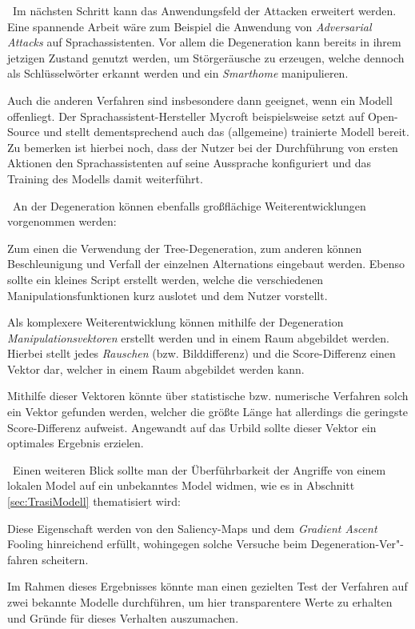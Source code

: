 ~\newline Im nächsten Schritt kann das Anwendungsfeld der Attacken erweitert werden. Eine spannende Arbeit wäre zum Beispiel die Anwendung von \textit{Adversarial Attacks} auf Sprachassistenten. 
Vor allem die Degeneration kann bereits in ihrem jetzigen Zustand genutzt werden, um Störgeräusche zu erzeugen, welche dennoch als Schlüsselwörter erkannt werden und ein \textit{Smarthome} manipulieren. 

Auch die anderen Verfahren sind insbesondere dann geeignet, wenn ein Modell offenliegt. Der Sprachassistent-Hersteller Mycroft beispielsweise setzt auf Open-Source und stellt dementsprechend auch das (allgemeine) trainierte Modell bereit. 
Zu bemerken ist hierbei noch, dass der Nutzer bei der Durchführung von ersten Aktionen den Sprachassistenten auf seine Aussprache konfiguriert und das Training des Modells damit weiterführt.  

~\newline An der Degeneration können ebenfalls großflächige Weiterentwicklungen vorgenommen werden: 

Zum einen die Verwendung der Tree-Degeneration, zum anderen können Beschleunigung und Verfall der einzelnen Alternations eingebaut werden. Ebenso sollte ein kleines Script erstellt werden, welche die verschiedenen Manipulationsfunktionen kurz auslotet und dem Nutzer vorstellt. 

Als komplexere Weiterentwicklung können mithilfe der Degeneration \textit{Manipulationsvektoren} erstellt werden und in einem Raum abgebildet werden. Hierbei stellt jedes \textit{Rauschen} (bzw. Bilddifferenz) und die Score-Differenz einen Vektor dar, welcher in einem Raum abgebildet werden kann.   

Mithilfe dieser Vektoren könnte über statistische bzw. numerische Verfahren solch ein Vektor gefunden werden, welcher die größte Länge hat allerdings die geringste Score-Differenz aufweist. Angewandt auf das Urbild sollte dieser Vektor ein optimales Ergebnis erzielen.  

~\newline Einen weiteren Blick sollte man der Überführbarkeit der Angriffe von einem lokalen Model auf ein unbekanntes Model widmen, wie es in Abschnitt \ref{sec:TrasiModell} thematisiert wird: 

Diese Eigenschaft werden von den Saliency-Maps und dem \textit{Gradient Ascent} Fooling hinreichend erfüllt, wohingegen solche Versuche beim Degeneration-Ver"-fahren scheitern. 

Im Rahmen dieses Ergebnisses könnte man einen gezielten Test der Verfahren auf zwei bekannte Modelle durchführen, um hier transparentere Werte zu erhalten und Gründe für dieses Verhalten auszumachen. 
